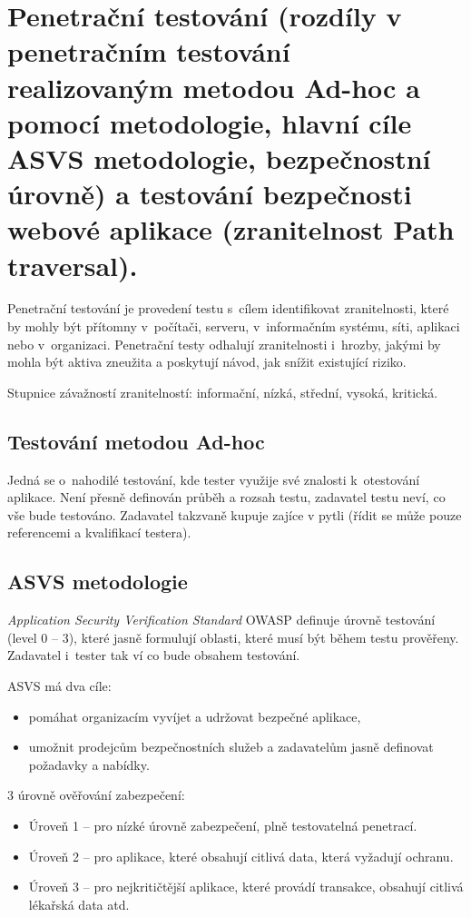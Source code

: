 \clearpage
\section{Penetrační testování (rozdíly v penetračním testování realizovaným metodou Ad-hoc a pomocí metodologie, hlavní cíle ASVS metodologie, bezpečnostní úrovně) a testování bezpečnosti webové aplikace (zranitelnost Path traversal).}

Penetrační testování je provedení testu s~cílem identifikovat zranitelnosti, které by mohly být přítomny v~počítači, serveru, v~informačním systému, síti, aplikaci nebo v~organizaci.
Penetrační testy odhalují zranitelnosti i~hrozby, jakými by mohla být aktiva zneužita a poskytují návod, jak snížit existující riziko.

Stupnice závažností zranitelností: informační, nízká, střední, vysoká, kritická.


\subsection{Testování metodou Ad-hoc}

Jedná se o~nahodilé testování, kde tester využije své znalosti k~otestování aplikace.
Není přesně definován průběh a rozsah testu, zadavatel testu neví, co vše bude testováno.
Zadavatel takzvaně kupuje zajíce v pytli (řídit se může pouze referencemi a kvalifikací testera).


\subsection{ASVS metodologie}

\textit{Application Security Verification Standard} OWASP definuje úrovně testování (level 0 -- 3), které jasně formulují oblasti, které musí být během testu prověřeny.
Zadavatel i~tester tak ví co bude obsahem testování.

ASVS má dva cíle:
\begin{itemize}
    \item pomáhat organizacím vyvíjet a udržovat bezpečné aplikace,
    \item umožnit prodejcům bezpečnostních služeb a zadavatelům jasně definovat požadavky a nabídky.
\end{itemize}

3 úrovně ověřování zabezpečení:
\begin{itemize}
    \item Úroveň 1 -- pro nízké úrovně zabezpečení, plně testovatelná penetrací.
    \item Úroveň 2 -- pro aplikace, které obsahují citlivá data, která vyžadují ochranu.
    \item Úroveň 3 -- pro nejkritičtější aplikace, které provádí transakce, obsahují citlivá lékařská data atd.
\end{itemize}



